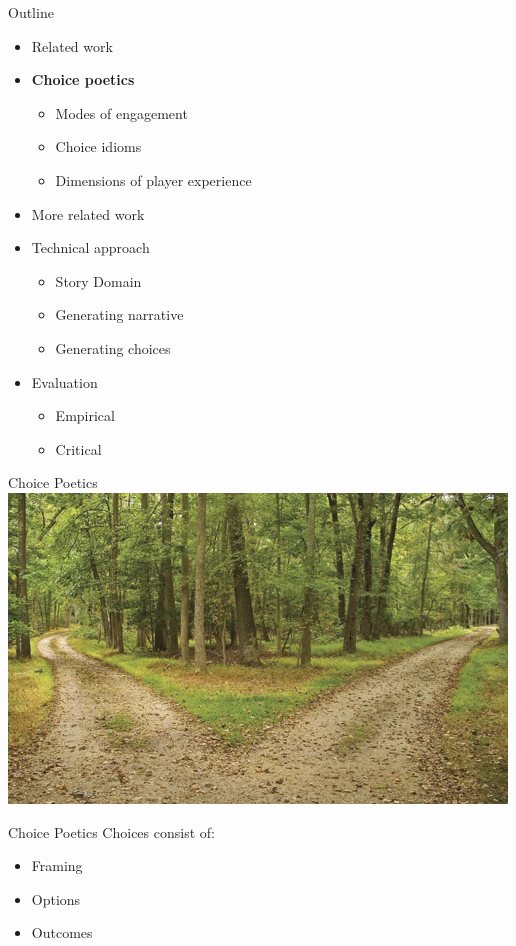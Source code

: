 \documentclass[xcolor=x11names]{beamer}
\begin{document}
\begin{frame}{Outline}
  \begin{itemize}
    \item Related work
    \item \textbf{Choice poetics}
    \begin{itemize}
      \item Modes of engagement
      \item Choice idioms
      \item Dimensions of player experience
    \end{itemize}
    \item More related work
    \item Technical approach
    \begin{itemize}
      \item Story Domain
      \item Generating narrative
      \item Generating choices
    \end{itemize}
    \item Evaluation
    \begin{itemize}
      \item Empirical
      \item Critical
    \end{itemize}
  \end{itemize}
\end{frame}

\begin{frame}{Choice Poetics}
  \includegraphics[width=\textwidth]{res/two-roads.jpg}
\end{frame}

\begin{frame}{Choice Poetics}
  Choices consist of:
  \begin{itemize}
    \item Framing
    \item Options
    \item Outcomes
  \end{itemize}
\end{frame}
\end{document}
